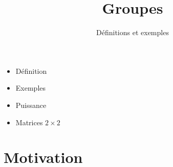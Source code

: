 


\newcommand{\GL}{\mathcal{G}\ell}






\title{{\bf Groupes}}
\subtitle{Définitions et exemples}

\begin{frame}
  
  \debutmontitre

  \pause

{\footnotesize
\hfill
{}
\begin{minipage}{0.6\textwidth}
  \begin{itemize}
    \item<3-> Définition
    \item<4-> Exemples
    \item<5-> Puissance
    \item<6-> Matrices $2\times 2$
  \end{itemize}
\end{minipage}
}

\end{frame}

\setcounter{framenumber}{0}




\section*{Motivation}


